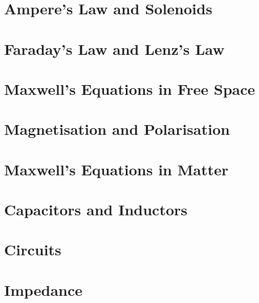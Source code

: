 \documentclass[
  letterpaper,
  DIV=11,
  numbers=noendperiod]{scrreprt}
\begin{document}

\chapter{Ampere's Law and Solenoids}\label{amperes-law-and-solenoids}


\chapter{Faraday's Law and Lenz's Law}\label{faradays-law-and-lenzs-law}


\chapter{Maxwell's Equations in Free
Space}\label{maxwells-equations-in-free-space}


\chapter{Magnetisation and
Polarisation}\label{magnetisation-and-polarisation}


\chapter{Maxwell's Equations in
Matter}\label{maxwells-equations-in-matter}


\chapter{Capacitors and Inductors}\label{capacitors-and-inductors}


\chapter{Circuits}\label{circuits}


\chapter{Impedance}\label{impedance}
\end{document}
